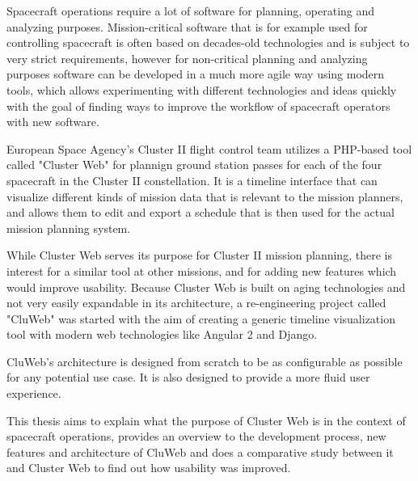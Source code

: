Spacecraft operations require a lot of software for planning, operating and analyzing purposes. Mission-critical software that is for example used for controlling spacecraft is often based on decades-old technologies and is subject to very strict requirements, however for non-critical planning and analyzing purposes software can be developed in a much more agile way using modern tools, which allows experimenting with different technologies and ideas quickly with the goal of finding ways to improve the workflow of spacecraft operators with new software.

European Space Agency's Cluster II flight control team utilizes a PHP-based tool called "Cluster Web" for plannign ground station passes for each of the four spacecraft in the Cluster II constellation. It is a timeline interface that can visualize different kinds of mission data that is relevant to the mission planners, and allows them to edit and export a schedule that is then used for the actual mission planning system.

While Cluster Web serves its purpose for Cluster II mission planning, there is interest for a similar tool at other missions, and for adding new features which would improve usability. Because Cluster Web is built on aging technologies and not very easily expandable in its architecture, a re-engineering project called "CluWeb" was started with the aim of creating a generic timeline visualization tool with modern web technologies like Angular 2 and Django.

CluWeb's architecture is designed from scratch to be as configurable as possible for any potential use case. It is also designed to provide a more fluid user experience.

This thesis aims to explain what the purpose of Cluster Web is in the context of spacecraft operations, provides an overview to the development process, new features and architecture of CluWeb and does a comparative study between it and Cluster Web to find out how usability was improved.
